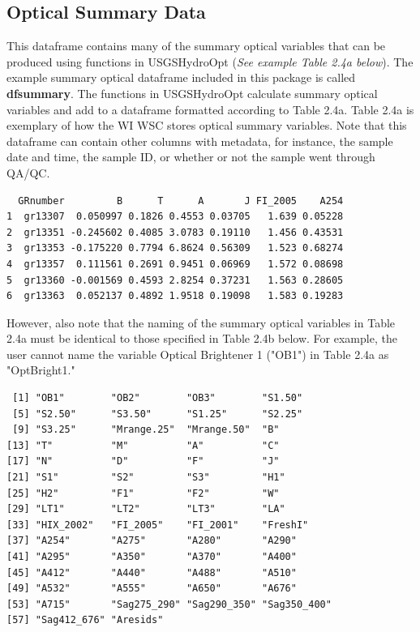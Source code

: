 \documentclass[a4paper,11pt]{article}\usepackage[]{graphicx}\usepackage[]{color}
\makeatletter
\newenvironment{kframe}{%
 \def\at@end@of@kframe{}%
 \ifinner\ifhmode%
  \def\at@end@of@kframe{\end{minipage}}%
  \begin{minipage}{\columnwidth}%
 \fi\fi%
 \def\FrameCommand##1{\hskip\@totalleftmargin \hskip-\fboxsep
 \colorbox{shadecolor}{##1}\hskip-\fboxsep
     \hskip-\linewidth \hskip-\@totalleftmargin \hskip\columnwidth}%
 \MakeFramed {\advance\hsize-\width
   \@totalleftmargin\z@ \linewidth\hsize
   \@setminipage}}%
 {\par\unskip\endMakeFramed%
 \at@end@of@kframe}
\newenvironment{knitrout}{}{} %
\makeatother
\begin{document}
\subsection{Optical Summary Data}
This dataframe contains many of the summary optical variables that can be produced using functions in USGSHydroOpt (\emph{See example Table 2.4a below}). The example summary optical dataframe included in this package is called \textbf{dfsummary}. The functions in USGSHydroOpt calculate summary optical variables and add to a dataframe formatted according to Table 2.4a. Table 2.4a is exemplary of how the WI WSC stores optical summary variables. Note that this dataframe can contain other columns with metadata, for instance, the sample date and time, the sample ID, or whether or not the sample went through QA/QC.

\begin{knitrout}
\color{fgcolor}\begin{kframe}
\begin{verbatim}
  GRnumber         B      T      A       J FI_2005    A254
1  gr13307  0.050997 0.1826 0.4553 0.03705   1.639 0.05228
2  gr13351 -0.245602 0.4085 3.0783 0.19110   1.456 0.43531
3  gr13353 -0.175220 0.7794 6.8624 0.56309   1.523 0.68274
4  gr13357  0.111561 0.2691 0.9451 0.06969   1.572 0.08698
5  gr13360 -0.001569 0.4593 2.8254 0.37231   1.563 0.28605
6  gr13363  0.052137 0.4892 1.9518 0.19098   1.583 0.19283
\end{verbatim}
\end{kframe}
\end{knitrout}

However, also note that the naming of the summary optical variables in Table 2.4a must be identical to those specified in Table 2.4b below. For example, the user cannot name the variable Optical Brightener 1 ("OB1") in Table 2.4a as "OptBright1."

\begin{knitrout}
\color{fgcolor}\begin{kframe}
\begin{verbatim}
 [1] "OB1"        "OB2"        "OB3"        "S1.50"     
 [5] "S2.50"      "S3.50"      "S1.25"      "S2.25"     
 [9] "S3.25"      "Mrange.25"  "Mrange.50"  "B"         
[13] "T"          "M"          "A"          "C"         
[17] "N"          "D"          "F"          "J"         
[21] "S1"         "S2"         "S3"         "H1"        
[25] "H2"         "F1"         "F2"         "W"         
[29] "LT1"        "LT2"        "LT3"        "LA"        
[33] "HIX_2002"   "FI_2005"    "FI_2001"    "FreshI"    
[37] "A254"       "A275"       "A280"       "A290"      
[41] "A295"       "A350"       "A370"       "A400"      
[45] "A412"       "A440"       "A488"       "A510"      
[49] "A532"       "A555"       "A650"       "A676"      
[53] "A715"       "Sag275_290" "Sag290_350" "Sag350_400"
[57] "Sag412_676" "Aresids"   
\end{verbatim}
\end{kframe}
\end{knitrout}
\end{document}
